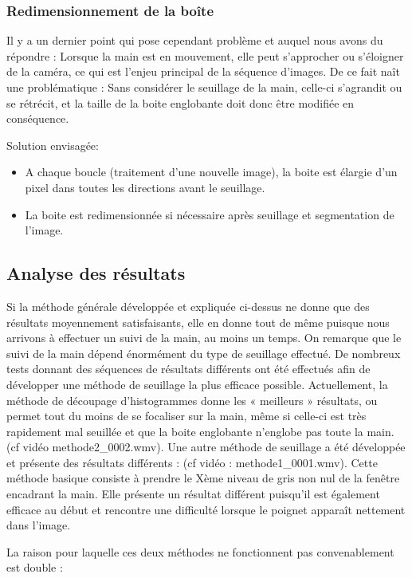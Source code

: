 \subsubsection{Redimensionnement de la boîte}

Il y a un dernier point qui pose cependant problème et auquel nous avons du répondre : Lorsque la main est en mouvement, elle peut s’approcher ou s’éloigner de la caméra, ce qui est l’enjeu principal de la séquence d’images. De ce fait naît une problématique : 
	Sans considérer le seuillage de la main, celle-ci s’agrandit ou se rétrécit, et la taille de la boite englobante doit donc être modifiée en conséquence.

Solution envisagée:
\begin{itemize}
\item A chaque boucle (traitement d’une nouvelle image), la boite est élargie d’un pixel dans toutes les directions avant le seuillage.
\item La boite est redimensionnée si nécessaire après seuillage et segmentation de l’image. 
\end{itemize}

\subsection{Analyse des résultats}
Si la méthode générale développée et expliquée ci-dessus ne donne que des résultats moyennement satisfaisants, elle en donne tout de même puisque nous arrivons à effectuer un suivi de la main, au moins un temps. 
	On remarque que le suivi de la main dépend énormément du type de seuillage effectué. De nombreux tests donnant des séquences de résultats différents ont été effectués afin de développer une méthode de seuillage la plus efficace possible. Actuellement, la méthode de découpage d’histogrammes donne les « meilleurs » résultats, ou permet tout du moins de se focaliser sur la main, même si celle-ci est très rapidement mal seuillée et que la boite englobante n’englobe pas toute la main. (cf vidéo methode2\_0002.wmv).
	Une autre méthode de seuillage a été développée et présente des résultats différents : (cf vidéo : methode1\_0001.wmv). Cette méthode basique consiste à prendre le Xème niveau de gris non nul de la fenêtre encadrant la main. Elle présente un résultat différent puisqu’il est également efficace au début et rencontre une difficulté lorsque le poignet apparaît nettement dans l’image.

La raison pour laquelle ces deux méthodes ne fonctionnent pas convenablement est double :

